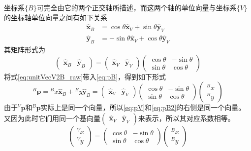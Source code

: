 \documentclass[UTF8,a4paper,10pt]{ctexart}
\begin{document}
坐标系$\{B\}$可完全由它的两个正交轴所描述，而这两个轴的单位向量与坐标系$\{V\}$的坐标轴单位向量之间有如下关系
\begin{align*}
  \hat{\mathbf{x}}_B&=\cos\theta\hat{\mathbf{x}}_V + \sin\theta\hat{\mathbf{y}}_V\\
  \hat{\mathbf{y}}_B&=-\sin\theta\hat{\mathbf{x}}_V + \cos\theta\hat{\mathbf{y}}_V
\end{align*}
其矩阵形式为
\begin{equation}\label{eq:unitVecV2B_raw}
  \begin{pmatrix}\hat{\mathbf{x}}_B&\hat{\mathbf{y}}_B\end{pmatrix}=
  \begin{pmatrix}\hat{\mathbf{x}}_V&\hat{\mathbf{y}}_V\end{pmatrix}
  \begin{pmatrix}\cos\theta  & -\sin\theta\\\sin\theta & \cos\theta\end{pmatrix}
\end{equation}
将式\eqref{eq:unitVecV2B_raw}带入\eqref{eq:pB}，得到如下形式
\begin{equation}\label{eq:pB2}
  {}^B\mathbf{p}={}^Bx\hat{\mathbf{x}}_B + {}^By\hat{\mathbf{y}}_B =
  \begin{pmatrix}\hat{\mathbf{x}}_V&\hat{\mathbf{y}}_V\end{pmatrix}
  \begin{pmatrix}\cos\theta  & -\sin\theta\\\sin\theta & \cos\theta\end{pmatrix}
  \begin{pmatrix}{}^Bx\\{}^By\end{pmatrix}
\end{equation}
由于${}^V\mathbf{p}$和${}^B\mathbf{p}$实际上是同一个向量，所以\eqref{eq:pV}和\eqref{eq:pB2}的右侧是同一个向量。
又因为此时它们用同一个基向量$\begin{pmatrix}\hat{\mathbf{x}}_V&\hat{\mathbf{y}}_V\end{pmatrix}$来表示，所以其对应系数相等。
\begin{equation}\label{eq:xyB2V_raw}
  \begin{pmatrix}{}^Vx\\{}^Vy\end{pmatrix}=
  \begin{pmatrix}\cos\theta  & -\sin\theta\\\sin\theta & \cos\theta\end{pmatrix}
  \begin{pmatrix}{}^Bx\\{}^By\end{pmatrix}
\end{equation}
\end{document}
